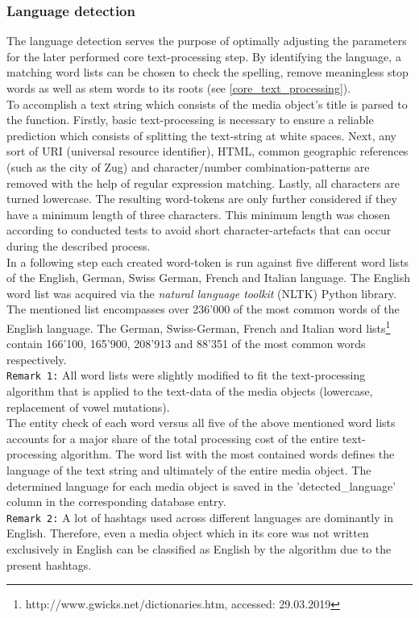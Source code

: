 \subsubsection*{Language detection} \label{language_detection}
The language detection serves the purpose of optimally adjusting the parameters for the later performed core text-processing step. By identifying the language, a matching word lists can be chosen to check the spelling, remove meaningless stop words as well as stem words to its roots (see \ref{core_text_processing}).\\
To accomplish a text string which consists of the media object's title is parsed to the function. Firstly, basic text-processing is necessary to ensure a reliable prediction which consists of splitting the text-string at white spaces. Next, any sort of URI (universal resource identifier), HTML, common geographic references (such as the city of Zug) and character/number combination-patterns are removed with the help of regular expression matching. Lastly, all characters are turned lowercase. The resulting word-tokens are only further considered if they have a minimum length of three characters. This minimum length was chosen according to conducted tests to avoid short character-artefacts that can occur during the described process.\\
In a following step each created word-token is run against five different word lists of the English, German, Swiss German, French and Italian language.
The English word list was acquired via the \textit{natural language toolkit} (NLTK) Python library. The mentioned list encompasses over 236'000 of the most common words of the English language.
The German, Swiss-German, French and Italian word lists\footnote{http://www.gwicks.net/dictionaries.htm, accessed: 29.03.2019} contain 166'100, 165'900, 208'913 and 88'351 of the most common words respectively.\\
\newline
\texttt{Remark 1:} All word lists were slightly modified to fit the text-processing algorithm that is applied to the text-data of the media objects (lowercase, replacement of vowel mutations).\\
\newline
The entity check of each word versus all five of the above mentioned word lists accounts for a major share of the total processing cost of the entire text-processing algorithm. The word list with the most contained words defines the language of the text string and ultimately of the entire media object. The determined language for each media object is saved in the 'detected\_language' column in the corresponding database entry.\\
\newline
\texttt{Remark 2:} A lot of hashtags used across different languages are dominantly in English. Therefore, even a media object which in its core was not written exclusively in English can be classified as English by the algorithm due to the present hashtags.

